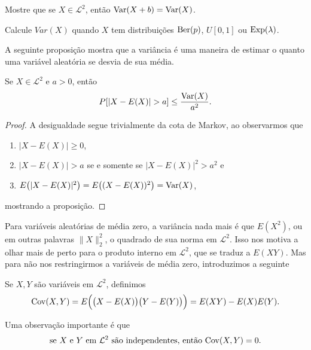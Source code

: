 \begin{exercise}
  Mostre que se $X \in \mathcal{L}^2$, então $\operatorname{Var}(X + b) = \operatorname{Var}(X)$.
\end{exercise}

\begin{exercise}
  Calcule $Var(X)$ quando $X$ tem distribuições $\operatorname{Ber}(p)$, $U[0,1]$ ou $\operatorname{Exp}(\lambda)$.
\end{exercise}

A seguinte proposição mostra que a variância é uma maneira de estimar o quanto uma variável aleatória se desvia de sua média.
\begin{proposition}
  Se $X \in \mathcal{L}^2$ e $a > 0$, então
  \begin{equation}
    P [ |X - E(X)| > a] \leq \frac{\operatorname{Var}(X)}{a^2}.
  \end{equation}
\end{proposition}

\begin{proof}
  A desigualdade segue trivialmente da cota de Markov, ao observarmos que
  \begin{enumerate}[\quad a)]
  \item $|X - E(X)| \geq 0$,
  \item $|X - E(X)| > a$ se e somente se $|X - E(X)|^2 > a^2$ e
  \item $E\big(|X - E(X)|^2\big) = E\big((X - E(X))^2\big) = \operatorname{Var}(X)$,
  \end{enumerate}
  mostrando a proposição.
\end{proof}

Para variáveis aleatórias de média zero, a variância nada mais é que $E(X^2)$, ou em outras palavras $\lVert X \rVert^2_2$, o quadrado de sua norma em $\mathcal{L}^2$.
Isso nos motiva a olhar mais de perto para o produto interno em $\mathcal{L}^2$, que se traduz a $E(XY)$.
Mas para não nos restringirmos a variáveis de média zero, introduzimos a seguinte

\begin{definition}
  Se $X, Y$ são variáveis em $\mathcal{L}^2$, definimos
  \begin{equation}
    \operatorname{Cov}(X,Y) = E\Big( \big(X - E(X)\big) \big(Y - E(Y)\big) \Big) = E(XY) - E(X)E(Y).
  \end{equation}
\end{definition}

Uma observação importante é que
\begin{equation}
  \text{se $X$ e $Y$ em $\mathcal{L}^2$ são independentes, então $\operatorname{Cov}(X,Y) = 0$.}
\end{equation}

